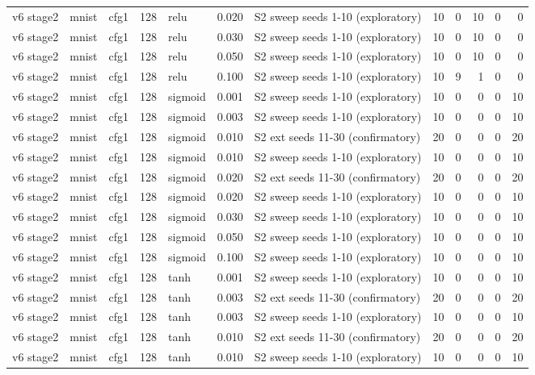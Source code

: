 \begin{table}[htbp]
{\begin{tabular}{@{}lllrlrlrrrrr@{}}
v6 stage2 & mnist & cfg1 & 128 & relu & 0.020 & S2 sweep seeds 1-10 (exploratory) & 10 & 0 & 10 & 0 & 0 \\
v6 stage2 & mnist & cfg1 & 128 & relu & 0.030 & S2 sweep seeds 1-10 (exploratory) & 10 & 0 & 10 & 0 & 0 \\
v6 stage2 & mnist & cfg1 & 128 & relu & 0.050 & S2 sweep seeds 1-10 (exploratory) & 10 & 0 & 10 & 0 & 0 \\
v6 stage2 & mnist & cfg1 & 128 & relu & 0.100 & S2 sweep seeds 1-10 (exploratory) & 10 & 9 & 1 & 0 & 0 \\
v6 stage2 & mnist & cfg1 & 128 & sigmoid & 0.001 & S2 sweep seeds 1-10 (exploratory) & 10 & 0 & 0 & 0 & 10 \\
v6 stage2 & mnist & cfg1 & 128 & sigmoid & 0.003 & S2 sweep seeds 1-10 (exploratory) & 10 & 0 & 0 & 0 & 10 \\
v6 stage2 & mnist & cfg1 & 128 & sigmoid & 0.010 & S2 ext seeds 11-30 (confirmatory) & 20 & 0 & 0 & 0 & 20 \\
v6 stage2 & mnist & cfg1 & 128 & sigmoid & 0.010 & S2 sweep seeds 1-10 (exploratory) & 10 & 0 & 0 & 0 & 10 \\
v6 stage2 & mnist & cfg1 & 128 & sigmoid & 0.020 & S2 ext seeds 11-30 (confirmatory) & 20 & 0 & 0 & 0 & 20 \\
v6 stage2 & mnist & cfg1 & 128 & sigmoid & 0.020 & S2 sweep seeds 1-10 (exploratory) & 10 & 0 & 0 & 0 & 10 \\
v6 stage2 & mnist & cfg1 & 128 & sigmoid & 0.030 & S2 sweep seeds 1-10 (exploratory) & 10 & 0 & 0 & 0 & 10 \\
v6 stage2 & mnist & cfg1 & 128 & sigmoid & 0.050 & S2 sweep seeds 1-10 (exploratory) & 10 & 0 & 0 & 0 & 10 \\
v6 stage2 & mnist & cfg1 & 128 & sigmoid & 0.100 & S2 sweep seeds 1-10 (exploratory) & 10 & 0 & 0 & 0 & 10 \\
v6 stage2 & mnist & cfg1 & 128 & tanh & 0.001 & S2 sweep seeds 1-10 (exploratory) & 10 & 0 & 0 & 0 & 10 \\
v6 stage2 & mnist & cfg1 & 128 & tanh & 0.003 & S2 ext seeds 11-30 (confirmatory) & 20 & 0 & 0 & 0 & 20 \\
v6 stage2 & mnist & cfg1 & 128 & tanh & 0.003 & S2 sweep seeds 1-10 (exploratory) & 10 & 0 & 0 & 0 & 10 \\
v6 stage2 & mnist & cfg1 & 128 & tanh & 0.010 & S2 ext seeds 11-30 (confirmatory) & 20 & 0 & 0 & 0 & 20 \\
v6 stage2 & mnist & cfg1 & 128 & tanh & 0.010 & S2 sweep seeds 1-10 (exploratory) & 10 & 0 & 0 & 0 & 10 \\

\end{tabular}}
\end{table}
